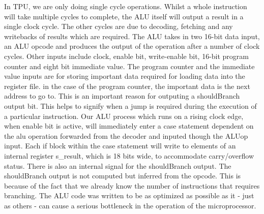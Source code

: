 In TPU, we are only doing single cycle operations. Whilst a whole instruction will take multiple cycles to complete, the ALU itself will output a result in a single clock cycle. The other cycles are due to decoding, fetching and any writebacks of results which are required. The ALU takes in two 16-bit data input, an ALU opcode and produces the output of the operation after a number of clock cycles. 
Other inputs include clock, enable bit, write-enable bit, 16-bit program counter and eight bit immediate value. The program counter and the immediate value inputs are for storing important data required for loading data into the register file. in the case of the program counter, the important data is the next address to go to. This is an important reason for outputing a shouldBranch output bit. This helps to signify when a jump is required during the execution of a particular instruction.
Our ALU process which runs on a rising clock edge, when enable bit is active, will immediately enter a case statement dependent on the alu operation forwarded from the decoder and inputed though the ALUop input. Each if block within the case statement will write to elements of an internal register s_result, which is 18 bits wide, to accommodate carry/overflow status. There is also an internal signal for the shouldBranch output. The shouldBranch output is not computed but inferred from the opcode. This is because of the fact that we already know the number of instructions that requires branching. 
The ALU code was written to be as optimized as possible as it - just as others - can cause a serious bottleneck in the operation of the microprocessor.
